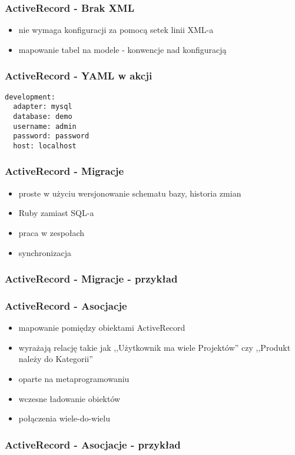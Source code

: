 \documentclass[12t]{beamer}
\begin{document}
\begin{frame}
  \frametitle{ActiveRecord - Brak XML}
  \begin{itemize}
  \item nie wymaga konfiguracji za pomocą setek linii XML-a
  \item mapowanie tabel na modele - konwencje nad konfiguracją
  \end{itemize}
\end{frame}

\begin{frame}[fragile]
  \frametitle{ActiveRecord - YAML w akcji}
\begin{verbatim}
development:
  adapter: mysql
  database: demo
  username: admin
  password: password
  host: localhost
\end{verbatim}
\end{frame}

\begin{frame}
  \frametitle{ActiveRecord - Migracje}
  \begin{itemize}
  \item proste w użyciu wersjonowanie schematu bazy, historia zmian
  \item Ruby zamiast SQL-a
  \item praca w zespołach
  \item synchronizacja
  \end{itemize}
\end{frame}

\begin{frame}[fragile]
  \frametitle{ActiveRecord - Migracje - przykład}
  
\end{frame}

\begin{frame}
  \frametitle{ActiveRecord - Asocjacje}
  \begin{itemize}
  \item mapowanie pomiędzy obiektami ActiveRecord
  \item wyrażają relację takie jak ,,Użytkownik ma wiele Projektów''
    czy ,,Produkt należy do Kategorii''
  \item oparte na metaprogramowaniu
  \item wczesne ładowanie obiektów
  \item połączenia wiele-do-wielu
  \end{itemize}
\end{frame}

\begin{frame}[fragile]
  \frametitle{ActiveRecord - Asocjacje - przykład}
  
\end{frame}
\end{document}
